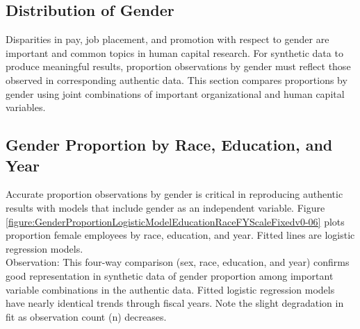 \documentclass[10pt, letterpaper]{article}
\begin{document}
\begin{spacing}{1.0}
\clearpage

\section{Distribution of Gender}

Disparities in pay, job placement, and promotion with respect to gender are important and common topics in human capital research.  For synthetic data to produce meaningful results, proportion observations by gender must reflect those observed in corresponding authentic data.  This section compares proportions by gender using joint combinations of important organizational and human capital variables.

\subsection{Gender Proportion by Race, Education, and Year}

Accurate proportion observations by gender is critical in reproducing authentic results with models that include gender as an independent variable.  Figure \ref{figure:GenderProportionLogisticModelEducationRaceFYScaleFixedv0-06} plots proportion female employees by race, education, and year.  Fitted lines are logistic regression models.\\

Observation:  This four-way comparison (sex, race, education, and year) confirms good representation in synthetic data of gender proportion among important variable combinations in the authentic data.  Fitted logistic regression models have nearly identical trends through fiscal years.  Note the slight degradation in fit as observation count (n) decreases.\\


\end{spacing}
\end{document}
